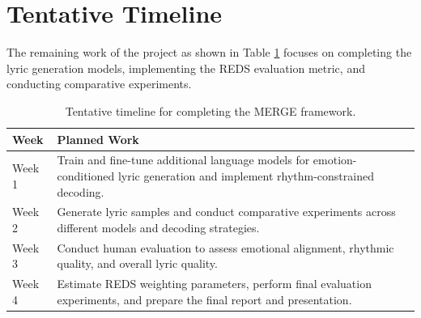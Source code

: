 \documentclass[11pt]{article}
\begin{document}



\section{Tentative Timeline}

The remaining work of the project as shown in Table \ref{tab:timeline} focuses on completing the lyric generation models, implementing the REDS evaluation metric, and conducting comparative experiments.

\begin{table}[h]
\centering
\small
\begin{tabular}{p{} p{}}
\toprule
\textbf{Week} & \textbf{Planned Work} \\
\midrule

Week 1 &
Train and fine-tune additional language models for emotion-conditioned lyric generation and implement rhythm-constrained decoding. \\

Week 2 &
Generate lyric samples and conduct comparative experiments across different models and decoding strategies. \\

Week 3 &
Conduct human evaluation to assess emotional alignment, rhythmic quality, and overall lyric quality. \\

Week 4 &
Estimate REDS weighting parameters, perform final evaluation experiments, and prepare the final report and presentation. \\

\bottomrule
\end{tabular}

\caption{Tentative timeline for completing the MERGE framework.}
\label{tab:timeline}
\end{table}

\newpage

\end{document}
